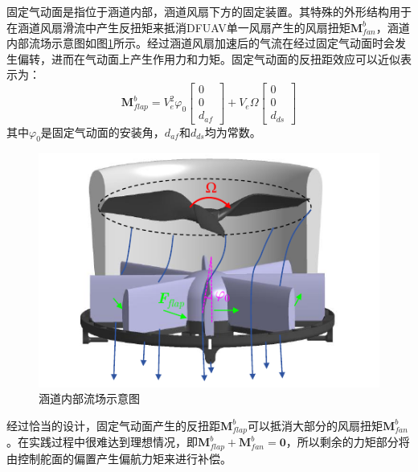 固定气动面是指位于涵道内部，涵道风扇下方的固定装置。其特殊的外形结构用于在涵道风扇滑流中产生反扭矩来抵消DFUAV单一风扇产生的风扇扭矩$\boldsymbol{M}_{fan}^b$，涵道内部流场示意图如图\ref{固定气动面}所示。经过涵道风扇加速后的气流在经过固定气动面时会发生偏转，进而在气动面上产生作用力和力矩。固定气动面的反扭距效应可以近似表示为\cite{1020333010.nh}：
\begin{equation}
    \boldsymbol{M}_{flap}^b=V_e^2\varphi_0
    \begin{bmatrix}
    0 \\0 \\d_{af}
    \end{bmatrix}
    +V_e\Omega
    \begin{bmatrix}
    0 \\0 \\d_{ds}
    \end{bmatrix}
    \label{eq_39}
\end{equation}
其中$\varphi_0$是固定气动面的安装角，$d_{af}$和$d_{ds}$均为常数。

\begin{figure}[htbp]
	\centering
	\begin{minipage}[c]{1\textwidth} 
		\centering
		\includegraphics[scale=1]{Fig/固定气动面.pdf}
	\end{minipage}%
    \caption{\label{固定气动面}涵道内部流场示意图}
\end{figure}

经过恰当的设计，固定气动面产生的反扭距$\boldsymbol{M}_{flap}^b$可以抵消大部分的风扇扭矩$\boldsymbol{M}_{fan}^b$。在实践过程中很难达到理想情况，即$\boldsymbol{M}_{flap}^b + \boldsymbol{M}_{fan}^b = \boldsymbol{0}$，所以剩余的力矩部分将由控制舵面的偏置产生偏航力矩来进行补偿。

